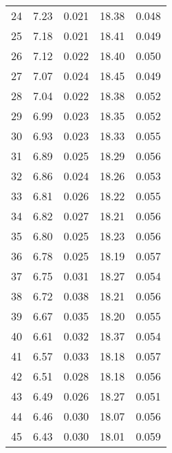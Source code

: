 \begin{table}
\begin{tabular}{c|ll|ll}
24 & 7.23 & 0.021 & 18.38 & 0.048 \\
25 & 7.18 & 0.021 & 18.41 & 0.049 \\
26 & 7.12 & 0.022 & 18.40 & 0.050 \\
27 & 7.07 & 0.024 & 18.45 & 0.049 \\
28 & 7.04 & 0.022 & 18.38 & 0.052 \\
29 & 6.99 & 0.023 & 18.35 & 0.052 \\
30 & 6.93 & 0.023 & 18.33 & 0.055 \\
31 & 6.89 & 0.025 & 18.29 & 0.056 \\
32 & 6.86 & 0.024 & 18.26 & 0.053 \\
33 & 6.81 & 0.026 & 18.22 & 0.055 \\
34 & 6.82 & 0.027 & 18.21 & 0.056 \\
35 & 6.80 & 0.025 & 18.23 & 0.056 \\
36 & 6.78 & 0.025 & 18.19 & 0.057 \\
37 & 6.75 & 0.031 & 18.27 & 0.054 \\
38 & 6.72 & 0.038 & 18.21 & 0.056 \\
39 & 6.67 & 0.035 & 18.20 & 0.055 \\
40 & 6.61 & 0.032 & 18.37 & 0.054 \\
41 & 6.57 & 0.033 & 18.18 & 0.057 \\
42 & 6.51 & 0.028 & 18.18 & 0.056 \\
43 & 6.49 & 0.026 & 18.27 & 0.051 \\
44 & 6.46 & 0.030 & 18.07 & 0.056 \\
45 & 6.43 & 0.030 & 18.01 & 0.059 \\
               \hline
        \end{tabular}
    \end{table}
    \clearpage

